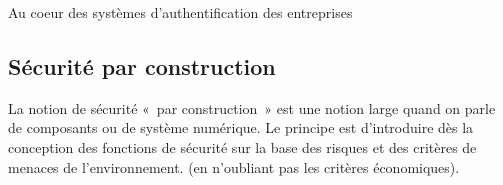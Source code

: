 \begin{nota}
\utodo
\end{nota}

\begin{nota}[DMZ]
\utodo
\end{nota}

\begin{nota}[Annuaire]
Au coeur des systèmes d’authentification des entreprises \utodo
\end{nota}


\begin{nota}[VPN]
\utodo
\end{nota}


\begin{nota}[Signature]
\utodo
\end{nota}

\begin{nota}
\utodo
\end{nota}

\begin{nota}[Proxy]
\utodo
\end{nota}
\begin{nota}[Routeur]
\utodo
\end{nota}

\begin{nota}
\utodo
\end{nota}


\subsection{Sécurité par construction}

La notion de sécurité « par construction » est une notion large quand on parle de composants ou de système numérique.
Le principe est d’introduire dès la conception des fonctions de sécurité sur la base des risques et des critères de menaces de l’environnement. (en n’oubliant pas les critères économiques).

